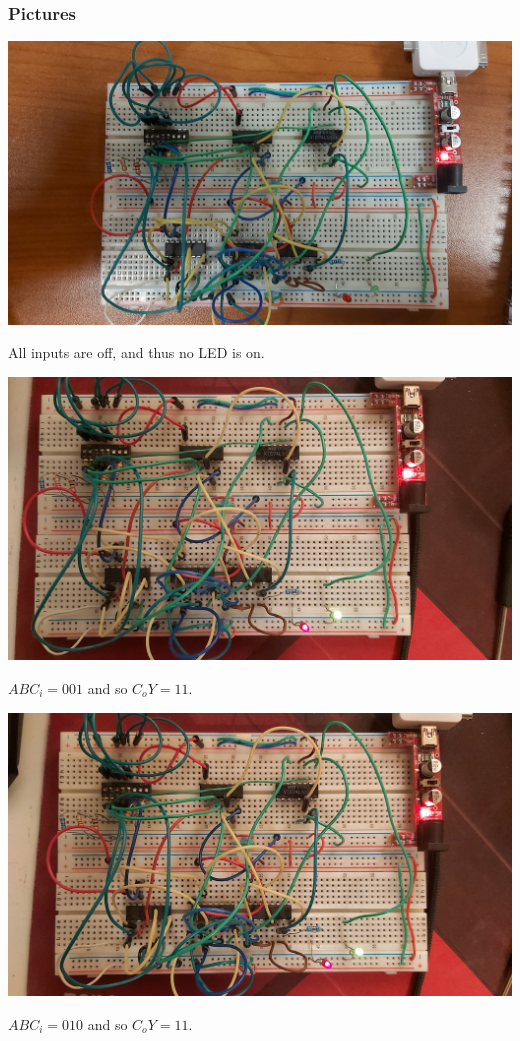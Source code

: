\documentclass{article}
\begin{document}
\newpage

\subsubsection{Pictures}

\includegraphics[angle=180, width=\textwidth]{./figures/00011.jpg}
\begin{center}
	All inputs are off, and thus no LED is on.
\end{center}

\vspace{1em}

\includegraphics[width=\textwidth]{./figures/00111.jpg}
\begin{center}
	$ABC_i = 001$ and so $C_o Y= 11$.
\end{center}

\includegraphics[width=\textwidth]{./figures/01011.jpg}
\begin{center}
	$ABC_i = 010$ and so $C_o Y= 11$.
\end{center}
\end{document}
